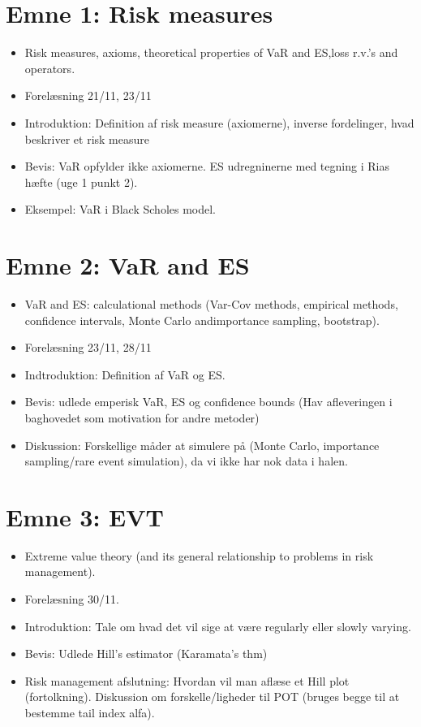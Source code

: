 \documentclass[
]{book}
\providecommand{\tightlist}{%
  \setlength{\itemsep}{0pt}\setlength{\parskip}{0pt}}
\begin{document}
\hypertarget{emne-1-risk-measures}{%
\section{Emne 1: Risk measures}\label{emne-1-risk-measures}}

\begin{itemize}
\tightlist
\item
  Risk measures, axioms, theoretical properties of VaR and ES,loss r.v.'s and operators.
\item
  Forelæsning 21/11, 23/11
\item
  Introduktion: Definition af risk measure (axiomerne), inverse fordelinger, hvad beskriver et risk measure
\item
  Bevis: VaR opfylder ikke axiomerne. ES udregninerne med tegning i Rias hæfte (uge 1 punkt 2).
\item
  Eksempel: VaR i Black Scholes model.
\end{itemize}

\hypertarget{emne-2-var-and-es}{%
\section{Emne 2: VaR and ES}\label{emne-2-var-and-es}}

\begin{itemize}
\tightlist
\item
  VaR and ES: calculational methods (Var-Cov methods, empirical methods, confidence intervals, Monte Carlo andimportance sampling, bootstrap).
\item
  Forelæsning 23/11, 28/11
\item
  Indtroduktion: Definition af VaR og ES.
\item
  Bevis: udlede emperisk VaR, ES og confidence bounds (Hav afleveringen i baghovedet som motivation for andre metoder)
\item
  Diskussion: Forskellige måder at simulere på (Monte Carlo, importance sampling/rare event simulation), da vi ikke har nok data i halen.
\end{itemize}

\hypertarget{emne-3-evt}{%
\section{Emne 3: EVT}\label{emne-3-evt}}

\begin{itemize}
\tightlist
\item
  Extreme value theory (and its general relationship to problems in risk management).
\item
  Forelæsning 30/11.
\item
  Introduktion: Tale om hvad det vil sige at være regularly eller slowly varying.
\item
  Bevis: Udlede Hill's estimator (Karamata's thm)
\item
  Risk management afslutning: Hvordan vil man aflæse et Hill plot (fortolkning). Diskussion om forskelle/ligheder til POT (bruges begge til at bestemme tail index alfa).
\end{itemize}
\end{document}

